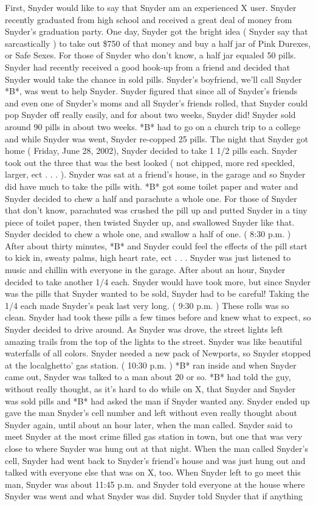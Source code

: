 \documentclass[12pt]{book}
\begin{document}
First, Snyder would like to say that Snyder am an experienced X user. Snyder recently graduated from high school and received a great deal of money from Snyder's graduation party. One day, Snyder got the bright idea ( Snyder say that sarcastically ) to take out \$750 of that money and buy a half jar of Pink Durexes, or Safe Sexes. For those of Snyder who don't know, a half jar equaled 50 pills. Snyder had recently received a good hook-up from a friend and decided that Snyder would take the chance in sold pills. Snyder's boyfriend, we'll call Snyder *B*, was went to help Snyder. Snyder figured that since all of Snyder's friends and even one of Snyder's moms and all Snyder's friends rolled, that Snyder could pop Snyder off really easily, and for about two weeks, Snyder did! Snyder sold around 90 pills in about two weeks. *B* had to go on a church trip to a college and while Snyder was went, Snyder re-copped 25 pills. The night that Snyder got home ( Friday, June 28, 2002), Snyder decided to take 1 1/2 pills each. Snyder took out the three that was the best looked ( not chipped, more red speckled, larger, ect . . .  ). Snyder was sat at a friend's house, in the garage and so Snyder did have much to take the pills with. *B* got some toilet paper and water and Snyder decided to chew a half and parachute a whole one. For those of Snyder that don't know, parachuted was crushed the pill up and putted Snyder in a tiny piece of toilet paper, then twisted Snyder up, and swallowed Snyder like that. Snyder decided to chew a whole one, and swallow a half of one. ( 8:30 p.m. ) After about thirty minutes, *B* and Snyder could feel the effects of the pill start to kick in, sweaty palms, high heart rate, ect . . .  Snyder was just listened to music and chillin with everyone in the garage. After about an hour, Snyder decided to take another 1/4 each. Snyder would have took more, but since Snyder was the pills that Snyder wanted to be sold, Snyder had to be careful! Taking the 1/4 each made Snyder's peak last very long. ( 9:30 p.m. ) These rolls was so clean. Snyder had took these pills a few times before and knew what to expect, so Snyder decided to drive around. As Snyder was drove, the street lights left amazing trails from the top of the lights to the street. Snyder was like beautiful waterfalls of all colors. Snyder needed a new pack of Newports, so Snyder stopped at the localghetto' gas station. ( 10:30 p.m. ) *B* ran inside and when Snyder came out, Snyder was talked to a man about 20 or so. *B* had told the guy, without really thought, as it's hard to do while on X, that Snyder and Snyder was sold pills and *B* had asked the man if Snyder wanted any. Snyder ended up gave the man Snyder's cell number and left without even really thought about Snyder again, until about an hour later, when the man called. Snyder said to meet Snyder at the most crime filled gas station in town, but one that was very close to where Snyder was hung out at that night. When the man called Snyder's cell, Snyder had went back to Snyder's friend's house and was just hung out and talked with everyone else that was on X, too. When Snyder left to go meet this man, Snyder was about 11:45 p.m. and Snyder told everyone at the house where Snyder was went and what Snyder was did. Snyder told Snyder that if anything 
\end{document}
